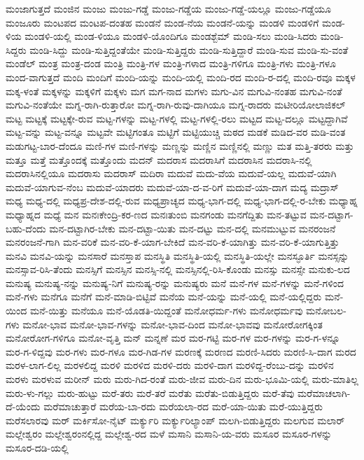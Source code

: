 {ಮಂಜಾಗುತ್ತದೆ
ಮಂಜಿನ
ಮಂಜು
ಮಂಜು-ಗಡ್ಡೆ
ಮಂಜು-ಗಡ್ಡೆಯ
ಮಂಜು-ಗಡ್ಡೆ-ಯಲ್ಲೂ
ಮಂಜು-ಗಡ್ಡೆಯೂ
ಮಂಜೂರು
ಮಂಟಪದ
ಮಂಟಪ-ದಂತಹ
ಮಂಡನೆ
ಮಂಡ-ನೆಯ
ಮಂಡನೆ-ಯನ್ನು
ಮಂಡಳಿ
ಮಂಡಳಿಗೆ
ಮಂಡ-ಳಿಯ
ಮಂಡಳಿ-ಯಲ್ಲಿ
ಮಂಡ-ಳಿಯೂ
ಮಂಡಳಿ-ಯೊಂದಿಗೂ
ಮಂಡಶ್ಬೆಮ್
ಮಂಡಿ-ಸಲು
ಮಂಡಿ-ಸಿದರು
ಮಂಡಿ-ಸಿದ್ದರು
ಮಂಡಿ-ಸಿದ್ದು
ಮಂಡಿ-ಸುತ್ತಿದ್ದಂತೆಯೇ
ಮಂಡಿ-ಸುತ್ತಿದ್ದರು
ಮಂಡಿ-ಸುತ್ತಿದ್ದಾರೆ
ಮಂಡಿ-ಸುವ
ಮಂಡಿ-ಸು-ವಂತೆ
ಮಂಡೆಲ್
ಮಂತ್ರ
ಮಂತ್ರ-ದಂಡ
ಮಂತ್ರಿ
ಮಂತ್ರಿ-ಗಳ
ಮಂತ್ರಿ-ಗಳಾದ
ಮಂತ್ರಿ-ಗಳಿಗೂ
ಮಂತ್ರಿ-ಗಳು
ಮಂತ್ರಿ-ಗಳೂ
ಮಂದ-ವಾಗುತ್ತದೆ
ಮಂದಿ
ಮಂದಿಗೆ
ಮಂದಿ-ಯನ್ನು
ಮಂದಿ-ಯಲ್ಲಿ
ಮಂದಿ-ರದ
ಮಂದಿ-ರ-ದಲ್ಲಿ
ಮಂದಿ-ರವೂ
ಮಕ್ಕಳ
ಮಕ್ಕ-ಳಂತೆ
ಮಕ್ಕಳನ್ನು
ಮಕ್ಕಳಿಗೆ
ಮಕ್ಕಳು
ಮಗ
ಮಗ-ನಾದ
ಮಗಳು
ಮಗು-ವಿನ
ಮಗುವಿ-ನಂತಹ
ಮಗುವಿ-ನಂತೆ
ಮಗುವಿ-ನಂತೆಯೇ
ಮಗ್ನ-ರಾಗಿ-ರುತ್ತಾರೋ
ಮಗ್ನ-ರಾಗಿ-ರುವು-ದಾಗಿಯೂ
ಮಗ್ನ-ರಾದರು
ಮಟೀರಿಯೋಲಾಜಿಕಲ್
ಮಟ್ಟ
ಮಟ್ಟಕ್ಕೆ
ಮಟ್ಟಕ್ಕೇ-ರುವ
ಮಟ್ಟ-ಗಳನ್ನು
ಮಟ್ಟ-ಗಳಲ್ಲಿ
ಮಟ್ಟ-ಗಳಲ್ಲಿ-ರಲು
ಮಟ್ಟದ
ಮಟ್ಟ-ದಲ್ಲೂ
ಮಟ್ಟದ್ದಾಗಿವೆ
ಮಟ್ಟ-ವನ್ನು
ಮಟ್ಟ-ವನ್ನೂ
ಮಟ್ಟವೇ
ಮಟ್ಟಿಗಂತೂ
ಮಟ್ಟಿಗೆ
ಮಟ್ಟಿಯುಚ್ಚಿ
ಮಠದ
ಮಡಕೆ
ಮಡಿದ-ವರ
ಮಡಿ-ವಂತ
ಮಡುಗಟ್ಟ-ಬಾರ-ದೆಂದೂ
ಮಣಿ-ಗಳ
ಮಣಿ-ಗಳನ್ನು
ಮಣ್ಣನ್ನು
ಮಣ್ಣಿನ
ಮಣ್ಣಿನಲ್ಲಿ
ಮಣ್ಣು
ಮತ
ಮತ್ತಿ-ತರರು
ಮತ್ತು
ಮತ್ತೂ
ಮತ್ತೆ
ಮತ್ತೊಂದಕ್ಕೆ
ಮತ್ತೊಂದು
ಮದನ್
ಮದರಾಸ
ಮದರಾಸಿಗೆ
ಮದರಾಸಿನ
ಮದರಾಸಿ-ನಲ್ಲಿ
ಮದರಾಸಿನಲ್ಲಿಯೂ
ಮದರಾಸು
ಮದರಾಸ್
ಮದಿರಾ
ಮದುವೆ
ಮದು-ವೆಯ
ಮದುವೆ-ಯಲ್ಲ
ಮದುವೆ-ಯಾಗಿ
ಮದುವೆ-ಯಾಗುವ-ನೆಂಬ
ಮದುವೆ-ಯಾದರು
ಮದುವೆ-ಯಾ-ದ-ವ-ರಿಗೆ
ಮದುವೆ-ಯಾ-ದಾಗ
ಮದ್ಯ
ಮದ್ರಾಸ್
ಮಧ್ಯ
ಮಧ್ಯ-ದಲ್ಲಿ
ಮಧ್ಯಪ್ರ-ದೇಶ-ದಲ್ಲಿ-ರುವ
ಮಧ್ಯಪ್ರಾಚ್ಯದ
ಮಧ್ಯ-ಭಾಗ-ದಲ್ಲಿ
ಮಧ್ಯ-ಭಾಗ-ದಲ್ಲಿ-ರ-ಬೇಕು
ಮಧ್ಯಾಹ್ನ
ಮಧ್ಯಾಹ್ನದ
ಮಧ್ಯೆ
ಮನ
ಮನಃಕೇಂದ್ರಿ-ಕರ-ಣದ
ಮನಃತುಂಬಿ
ಮನಗಂಡು
ಮನಗೆದ್ದಿತು
ಮನ-ತಟ್ಟುವ
ಮನ-ದಟ್ಟಾಗ-ಬಹು-ದೆಂದು
ಮನ-ದಟ್ಟಾಗಿರ-ಬೇಕು
ಮನ-ದಟ್ಟಾ-ಯಿತು
ಮನ-ದಟ್ಟು
ಮನ-ದಲ್ಲಿ
ಮನಮುಟ್ಟುವ
ಮನರಂಜನೆ
ಮನರಂಜನೆ-ಗಾಗಿ
ಮನ-ವರಿಕೆ
ಮನ-ವರಿ-ಕೆ-ಯಾಗ-ಬೇಕಿದೆ
ಮನ-ವರಿ-ಕೆ-ಯಾಗಿತ್ತು
ಮನ-ವರಿ-ಕೆ-ಯಾಗುತ್ತಿತ್ತು
ಮನವಿ
ಮನವಿ-ಯನ್ನು
ಮನಸಾರೆ
ಮನಸ್ತಾಪ
ಮನಸ್ಥಿತಿ
ಮನಸ್ಥಿತಿ-ಯಲ್ಲಿ
ಮನಸ್ಥಿತಿ-ಯಲ್ಲೇ
ಮನಸ್ಫೂರ್ತಿ
ಮನಸ್ಸನ್ನು
ಮನಸ್ಸಾವ-ರಿಸಿ-ತೆಂದು
ಮನಸ್ಸಿಗೆ
ಮನಸ್ಸಿನ
ಮನಸ್ಸಿ-ನಲ್ಲಿ
ಮನಸ್ಸಿನಲ್ಲಿ-ರಿಸಿ-ಕೊಂಡು
ಮನಸ್ಸು
ಮನಸ್ಸೇ
ಮನುಕು-ಲದ
ಮನುಷ್ಯ
ಮನುಷ್ಯ-ನನ್ನು
ಮನುಷ್ಯ-ನಿಗೆ
ಮನುಷ್ಯ-ರನ್ನು
ಮನುಷ್ಯರು
ಮನೆ
ಮನೆ-ಗಳ
ಮನೆ-ಗಳನ್ನು
ಮನೆ-ಗಳಿಂದ
ಮನೆ-ಗಳು
ಮನೆಗೂ
ಮನೆಗೆ
ಮನೆ-ಮಾಡಿ-ಬಿಟ್ಟಿವೆ
ಮನೆಯ
ಮನೆ-ಯನ್ನು
ಮನೆ-ಯಲ್ಲಿ
ಮನೆ-ಯಲ್ಲಿದ್ದರು
ಮನೆ-ಯಿಂದ
ಮನೆ-ಯಿತ್ತು
ಮನೆಯೂ
ಮನೆ-ಯೊಡತಿ-ಯಿದ್ದಂತೆ
ಮನೋಧರ್ಮ-ಗಳು
ಮನೋಧರ್ಮವು
ಮನೋಬಲ-ಗಳು
ಮನೋ-ಭಾವ
ಮನೋ-ಭಾವ-ಗಳನ್ನು
ಮನೋ-ಭಾವ-ದಿಂದ
ಮನೋ-ಭಾವವು
ಮನೋರೋಗಕ್ಕಿಂತ
ಮನೋರೋಗ-ಗಳಿಗೂ
ಮನೋ-ವೃತ್ತಿ
ಮನ್
ಮನ್ನಣೆ
ಮರ
ಮರ-ಗಟ್ಟಿ
ಮರ-ಗಳ
ಮರ-ಗಳನ್ನು
ಮರ-ಗ-ಳನ್ನೂ
ಮರ-ಗ-ಳಿದ್ದವು
ಮರ-ಗಳು
ಮರ-ಗಳೂ
ಮರ-ಗಿಡ-ಗಳ
ಮರಣಕ್ಕೆ
ಮರಣದ
ಮರಣಿ-ಸಿದರು
ಮರಣಿ-ಸಿ-ದಾಗ
ಮರದ
ಮರಳ-ಲಾಗ-ಲಿಲ್ಲ
ಮರಳಲಿದ್ದ
ಮರಳಿ
ಮರಳಿದ
ಮರಳಿ-ದರು
ಮರಳಿ-ದಾಗ
ಮರಳಿದ್ದ-ರೆಂಬು-ದನ್ನು
ಮರಳಿನ
ಮರಳು
ಮರಳುವ
ಮರೀನ್
ಮರು
ಮರು-ಗಿದ-ರಂತೆ
ಮರು-ಜೀವ
ಮರು-ದಿನ
ಮರು-ಭೂಮಿ-ಯಲ್ಲಿ
ಮರು-ಮಾತಿಲ್ಲ
ಮರು-ಳು-ಗಲ್ಲು
ಮರು-ಹುಟ್ಟು
ಮರೆ-ತರು
ಮರೆ-ತರೆ
ಮರೆತು
ಮರೆತು-ಬಿಡುತ್ತಿದ್ದರು
ಮರೆ-ತೆವು
ಮರೆಮಾಚಲಾಗಿ-ದೆ-ಯೆಂದು
ಮರೆಮಾಚುತ್ತಾರೆ
ಮರೆಯ-ಬಾ-ರದು
ಮರೆಯಲಾ-ರದ
ಮರೆ-ಯಾ-ಯಿತು
ಮರೆ-ಯುತ್ತಿದ್ದರು
ಮರೆಸಲಾರವು
ಮರ್
ಮರ್ಕಿಸೋ-ನೈಟ್
ಮರ್ಕ್ಯುರಿ
ಮರ್ಕ್ಯುರಿಲ್ಯಾಂಪ್
ಮಲಗಿ-ಬಿಡುತ್ತಿದ್ದರು
ಮಲಗುವ
ಮಲಾರ್
ಮಲ್ಲೇಶ್ವರಂ
ಮಲ್ಲೇಶ್ವರಂನಲ್ಲಿದ್ದ
ಮಲ್ಲೇಶ್ವ-ರದ
ಮಳೆ
ಮಸಾನಿ
ಮಸಾನಿ-ಯ-ವರು
ಮಸೂರ
ಮಸೂರ-ಗಳನ್ನು
ಮಸೂರ-ದಡಿ-ಯಲ್ಲಿ
}
